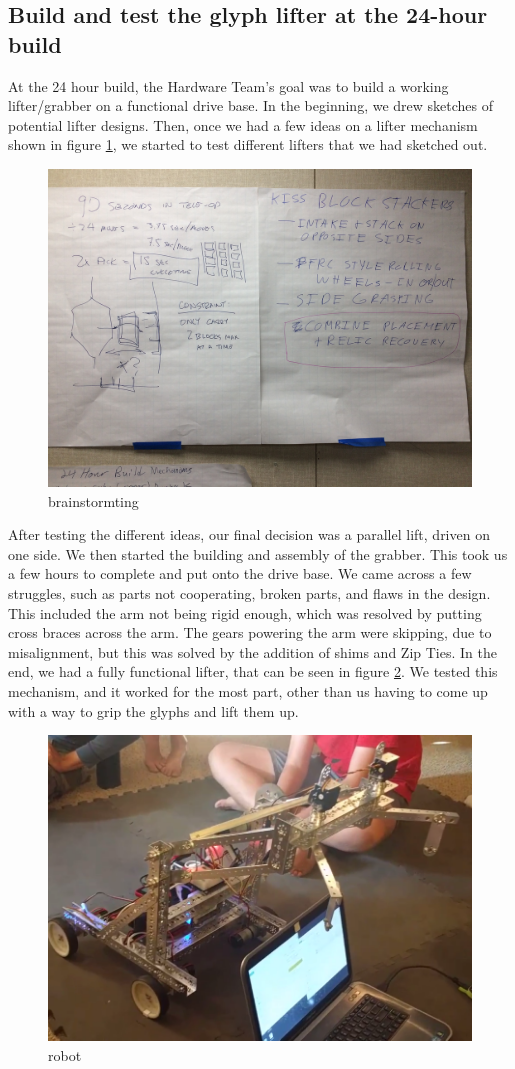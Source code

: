 \documentclass{article}
\begin{document}
\subsection{Build and test the glyph lifter at the 24-hour build}
At the 24 hour build, the Hardware Team's goal was to build a working lifter/grabber on a functional drive base. In the beginning, we drew sketches of potential lifter designs. Then, once we had a few ideas on a lifter mechanism shown in figure \ref{fig:brainstorm}, we started to test different lifters that we had sketched out. 
\begin{figure}[h]
    \centering
    \includegraphics[width=.6\textwidth]{01/images/brainstorm.jpg}
    \caption{brainstormting}
    \label{fig:brainstorm}
\end{figure}
After testing the different ideas, our final decision was a parallel lift, driven on one side. We then started the building and assembly of the grabber. This took us a few hours to complete and put onto the drive base. We came across a few struggles, such as parts not cooperating, broken parts, and flaws in the design. This included the arm not being rigid enough, which was resolved by putting cross braces across the arm. The gears powering the arm were skipping, due to misalignment, but this was solved by the addition of shims and Zip Ties. In the end, we had a fully functional lifter, that can be seen in figure \ref{fig:robot}. We tested this mechanism, and it worked for the most part, other than us having to come up with a way to grip the glyphs and lift them up. 
\begin{figure}[h]
    \centering
    \includegraphics[width=.6\textwidth]{01/images/robot.png}
    \caption{robot}
    \label{fig:robot}
\end{figure}
\end{document}
